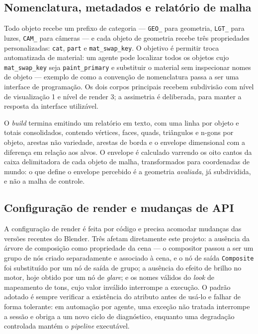\subsection{Nomenclatura, metadados e relat\'orio de malha}

Todo objeto recebe um prefixo de categoria --- \texttt{GEO\_} para geometria,
\texttt{LGT\_} para luzes, \texttt{CAM\_} para c\^ameras --- e cada objeto de geometria
recebe tr\^es propriedades personalizadas: \texttt{cat}, \texttt{part} e
\texttt{mat\_swap\_key}. O objetivo \'e permitir troca automatizada de material: um agente
pode localizar todos os objetos cujo \texttt{mat\_swap\_key} seja
\texttt{paint\_primary} e substituir o material sem inspecionar nomes de objeto ---
exemplo de como a conven\c{c}\~ao de nomenclatura passa a ser uma interface de
programa\c{c}\~ao. Os dois corpos principais recebem subdivis\~ao com n\'ivel de
visualiza\c{c}\~ao 1 e n\'ivel de render 3; a assimetria \'e deliberada, para manter a
resposta da interface utiliz\'avel.

O \emph{build} termina emitindo um relat\'orio em texto, com uma linha por objeto e totais
consolidados, contendo v\'ertices, faces, quads, tri\^angulos e n-gons por objeto, arestas
n\~ao variedade, arestas de borda e o envelope dimensional com a diferen\c{c}a em
rela\c{c}\~ao aos alvos. O envelope \'e calculado varrendo os oito cantos da caixa
delimitadora de cada objeto de malha, transformados para coordenadas de mundo: o que
define o envelope percebido \'e a geometria \emph{avaliada}, j\'a subdividida, e n\~ao a
malha de controle.

\subsection{Configura\c{c}\~ao de render e mudan\c{c}as de API}

A configura\c{c}\~ao de render \'e feita por c\'odigo e precisa acomodar mudan\c{c}as
das vers\~oes recentes do Blender. Tr\^es afetam diretamente este projeto: a aus\^encia da
\'arvore de composi\c{c}\~ao como propriedade da cena --- o compositor passou a ser um
grupo de n\'os criado separadamente e associado \`a cena, e o n\'o de sa\'ida
\texttt{Composite} foi substitu\'ido por um n\'o de sa\'ida de grupo; a aus\^encia do
efeito de brilho no motor, hoje obtido por um n\'o de \emph{glare}; e os nomes v\'alidos do
\emph{look} de mapeamento de tons, cujo valor inv\'alido interrompe a execu\c{c}\~ao. O
padr\~ao adotado \'e sempre verificar a exist\^encia do atributo antes de us\'a-lo e falhar
de forma tolerante: em automa\c{c}\~ao por agente, uma exce\c{c}\~ao n\~ao tratada interrompe
a sess\~ao e obriga a um novo ciclo de diagn\'ostico, enquanto uma degrada\c{c}\~ao
controlada mant\'em o \emph{pipeline} execut\'avel.

